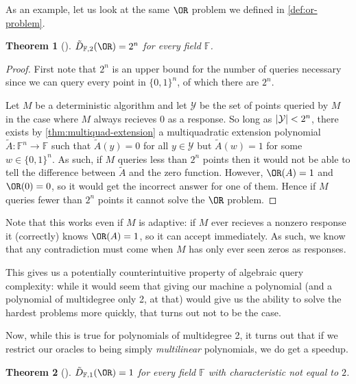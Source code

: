 \documentclass[english,12pt]{reedthesis}
\theoremstyle{plain}
\newtheorem{thm}{Theorem}[section]
\theoremstyle{definition}
\theoremstyle{remark}
\DeclarePairedDelimiter{\abs}{\lvert}{\rvert}
\begin{document}
As an example, let us look at the same $\OR$ problem we defined in
\cref{def:or-problem}.

\begin{thm}[{\cite[Thm.\ 4.4]{AW09}}]\label{thm:or-algebraic}
  $\tilde{D}_{\mathbb{F},2}(\OR) = 2^{n}$ for every field $\mathbb{F}$.
\end{thm}

\begin{proof}
  First note that $2^{n}$ is an upper bound for the number of queries necessary
  since we can query every point in $\{0, 1\}^{n}$, of which there are $2^{n}$.

  Let $M$ be a deterministic algorithm and let $\mathcal{Y}$ be the set of points queried
  by $M$ in the case where $M$ always recieves $0$ as a response. So long as
  $\abs{\mathcal{Y}} < 2^{n}$, there exists by \cref{thm:multiquad-extension} a
  multiquadratic extension polynomial
  $\tilde{A}\colon \mathbb{F}^{n} \rightarrow \mathbb{F}$ such that $\tilde{A}(y) = 0$ for
  all $y \in \mathcal{Y}$ but $\tilde{A}(w) = 1$ for some $w \in \{0, 1\}^{n}$. As such, if
  $M$ queries less than $2^{n}$ points then it would not be able to tell the
  difference between $\tilde{A}$ and the zero function. However, $\OR(A) = 1$
  and $\OR(0) = 0$, so it would get the incorrect answer for one of them. Hence
  if $M$ queries fewer than $2^{n}$ points it cannot solve the $\OR$ problem.
\end{proof}

Note that this works even if $M$ is adaptive: if $M$ ever recieves a nonzero
response it (correctly) knows $\OR(A) = 1$, so it can accept immediately. As
such, we know that any contradiction must come when $M$ has only ever seen zeros
as responses.

This gives us a potentially counterintuitive property of algebraic query
complexity: while it would seem that giving our machine a polynomial (and a
polynomial of multidegree only 2, at that) would give us the ability to solve
the hardest problems more quickly, that turns out not to be the case.

Now, while this is true for polynomials of multidegree 2, it turns out that if
we restrict our oracles to being simply \emph{multilinear} polynomials, we do
get a speedup.

\begin{thm}[{\cite[Thm. 3]{JKRS09}}]\label{thm:or-multilinear}
  $\tilde{D}_{\mathbb{F},1}(\OR) = 1$ for every field $\mathbb{F}$ with
  characteristic not equal to $2$.
\end{thm}
\end{document}
